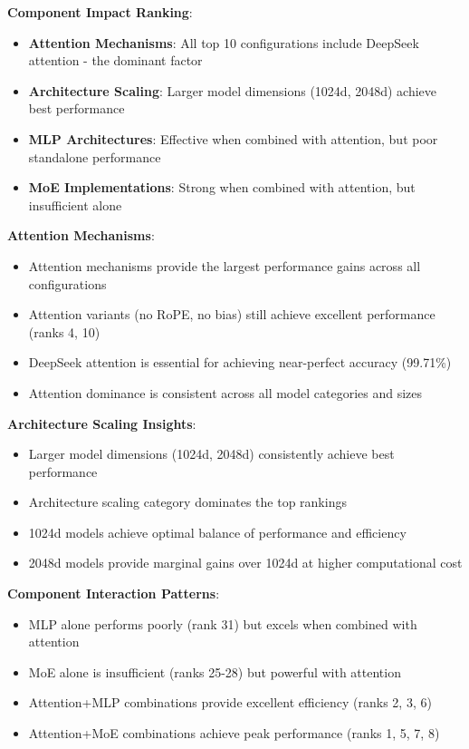 \documentclass[11pt,a4paper]{article}
\begin{document}
\textbf{Component Impact Ranking}:
\begin{itemize}
    \item \textbf{Attention Mechanisms}: All top 10 configurations include DeepSeek attention - the dominant factor
    \item \textbf{Architecture Scaling}: Larger model dimensions (1024d, 2048d) achieve best performance
    \item \textbf{MLP Architectures}: Effective when combined with attention, but poor standalone performance
    \item \textbf{MoE Implementations}: Strong when combined with attention, but insufficient alone
\end{itemize}

\textbf{Attention Mechanisms}:
\begin{itemize}
    \item Attention mechanisms provide the largest performance gains across all configurations
    \item Attention variants (no RoPE, no bias) still achieve excellent performance (ranks 4, 10)
    \item DeepSeek attention is essential for achieving near-perfect accuracy (99.71\%)
    \item Attention dominance is consistent across all model categories and sizes
\end{itemize}

\textbf{Architecture Scaling Insights}:
\begin{itemize}
    \item Larger model dimensions (1024d, 2048d) consistently achieve best performance
    \item Architecture scaling category dominates the top rankings
    \item 1024d models achieve optimal balance of performance and efficiency
    \item 2048d models provide marginal gains over 1024d at higher computational cost
\end{itemize}

\textbf{Component Interaction Patterns}:
\begin{itemize}
    \item MLP alone performs poorly (rank 31) but excels when combined with attention
    \item MoE alone is insufficient (ranks 25-28) but powerful with attention
    \item Attention+MLP combinations provide excellent efficiency (ranks 2, 3, 6)
    \item Attention+MoE combinations achieve peak performance (ranks 1, 5, 7, 8)
\end{itemize}
\end{document}
